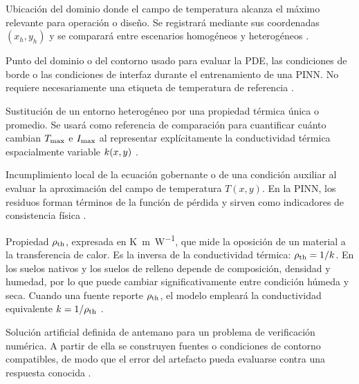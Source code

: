\begin{description}[style=nextline,itemsep=0.5\baselineskip,parsep=0pt,topsep=0.25\baselineskip]
  \item[Punto caliente.] Ubicación del dominio donde el campo de temperatura alcanza el máximo relevante para operación o diseño. Se registrará mediante sus coordenadas $(x_h,y_h)$ y se comparará entre escenarios homogéneos y heterogéneos \parencites[1,6--9]{khumalo2025}[1,10,16]{kim2025}.

  \item[Punto de colocación.] Punto del dominio o del contorno usado para evaluar la PDE, las condiciones de borde o las condiciones de interfaz durante el entrenamiento de una PINN. No requiere necesariamente una etiqueta de temperatura de referencia \parencites[686--690]{raissi2019}[1--2]{lawal2022}.

  \item[Representación homogénea equivalente.] Sustitución de un entorno heterogéneo por una propiedad térmica única o promedio. Se usará como referencia de comparación para cuantificar cuánto cambian $T_{\max}$ e $I_{\max}$ al representar explícitamente la conductividad térmica espacialmente variable $k(x,y)$ \parencites{farouki1981thermal,devries1966thermal}[4--6]{enescu2021}[3--4,41--42,93--99]{cigre2025}.

  \item[Residuo físico.] Incumplimiento local de la ecuación gobernante o de una condición auxiliar al evaluar la aproximación del campo de temperatura $T(x,y)$. En la PINN, los residuos forman términos de la función de pérdida y sirven como indicadores de consistencia física \parencites[686--690]{raissi2019}[1--2,14--17]{lawal2022}.

  \item[Resistividad térmica.] Propiedad $\rho_{\mathrm{th}}$, expresada en \si{\kelvin\metre\per\watt}, que mide la oposición de un material a la transferencia de calor. Es la inversa de la conductividad térmica: $\rho_{\mathrm{th}}=1/k$. En los suelos nativos y los suelos de relleno depende de composición, densidad y humedad, por lo que puede cambiar significativamente entre condición húmeda y seca. Cuando una fuente reporte $\rho_{\mathrm{th}}$, el modelo empleará la conductividad equivalente $k=1/\rho_{\mathrm{th}}$ \parencites{farouki1981thermal,devries1966thermal}[1,6--9]{khumalo2025}[secciones 4--6]{ieee442}.

  \item[Solución manufacturada.] Solución artificial definida de antemano para un problema de verificación numérica. A partir de ella se construyen fuentes o condiciones de contorno compatibles, de modo que el error del artefacto pueda evaluarse contra una respuesta conocida \parencites{cigre2022}[93--99]{cigre2025}.


\end{description}
